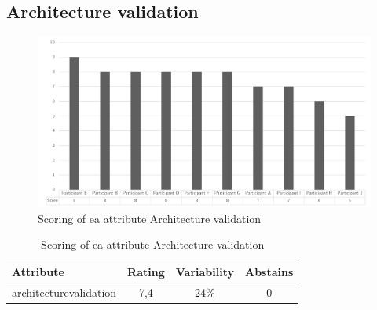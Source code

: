 \subsection{Architecture validation}
\begin{figure}[H]
	\centering
	\includegraphics[width=0.9\linewidth]{images/scoreeavalidation}
	\caption[Scoring of \gls{ea} attribute Architecture validation]{Scoring of \gls{ea} attribute Architecture validation}
	\label{fig:appscoringeavalidation}
\end{figure}
\begin{table}[H]
	\centering
	\begin{tabular}{p{}ccc}
		\toprule
		\textbf{Attribute} & \textbf{Rating} & \textbf{Variability} & \textbf{Abstains} \\
		\midrule
		\Gls{architecturevalidation} & 7,4 & 24\% & 0 \\%
		\bottomrule
	\end{tabular}%
	\caption[Scoring of \gls{ea} attribute Architecture validation]{Scoring of \gls{ea} attribute Architecture validation}
	\label{tab:appscoringeavalidation}%
\end{table}%
\newpage

